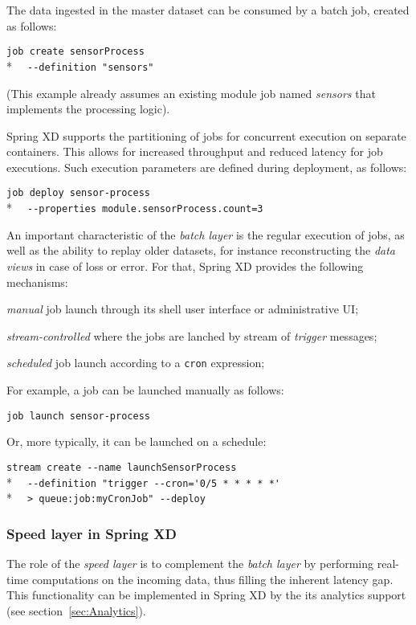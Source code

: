 The data ingested in the master dataset can be consumed by a batch job,
created as follows:

\verb;job create sensorProcess;\\*
\verb;  --definition "sensors";

(This example already assumes an existing module job named \emph{sensors} that
implements the processing logic).

Spring XD supports the partitioning of jobs for concurrent execution on
separate containers. This allows for increased throughput and reduced latency
for job executions. Such execution parameters are defined during deployment,
as follows:

\verb;job deploy sensor-process;\\*
\verb;  --properties module.sensorProcess.count=3;

An important characteristic of the \emph{batch layer} is the regular
execution of jobs, as well as the ability to replay older datasets, for
instance reconstructing the \emph{data views} in case of loss or error.
For that, Spring XD provides the following mechanisms:

\begin{itemize*}
\item \emph{manual} job launch through its shell user interface or 
administrative UI;
\item \emph{stream-controlled} where the jobs are lanched by stream of 
\emph{trigger} messages;
\item \emph{scheduled} job launch according to a \texttt{cron} expression;
\end{itemize*}

For example, a job can be launched manually as follows:

\verb;job launch sensor-process;

Or, more typically, it can be launched on a schedule:

\verb;stream create --name launchSensorProcess;\\*
\verb;  --definition "trigger --cron='0/5 * * * * *';\\* 
\verb;  > queue:job:myCronJob" --deploy;

\subsubsection {Speed layer in Spring XD}

The role of the \emph{speed layer} is to complement the \emph{batch layer} 
by performing real-time computations on the incoming data, thus filling the 
inherent latency gap. This functionality can be implemented in Spring XD by 
the its analytics support (see section~\ref{sec:Analytics}).

